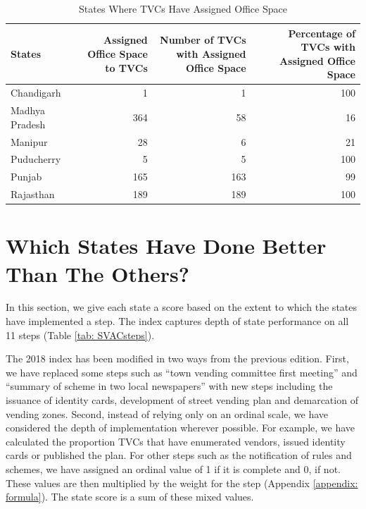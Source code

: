 \documentclass[a4paper, 12pt, twoside]{article}
\begin{document}
{%
\begin{table}[htpb]
\caption{States Where TVCs Have Assigned Office Space}
\label{tab: OfficeSpace}
\begin{tabular}{ l  r r r } %
\toprule
States & \multicolumn{1}{p{9em}}{Assigned Office Space to TVCs} & \multicolumn{1}{p{9em}}{Number of TVCs with Assigned Office Space} & \multicolumn{1}{p{9em}}{Percentage of TVCs with Assigned Office Space}\\
\midrule
Chandigarh & 1 & 1 & 100\\
Madhya Pradesh & 364 & 58 & 16\\
Manipur & 28 & 6 & 21\\
Puducherry & 5 & 5 & 100\\
Punjab & 165 & 163 & 99\\
Rajasthan & 189 & 189 & 100\\
\bottomrule
\end{tabular}
\end{table}

\section*{Which States Have Done Better Than The Others?}
	In this section, we give each state a score based on the extent to which the states have implemented a step. The index captures depth of state performance on all 11 steps (Table \ref{tab: SVACsteps}).

	The 2018 index has been modified in two ways from the previous edition. First, we have replaced some steps such as “town vending committee first meeting”  and “summary of scheme in two local newspapers” with new steps including the issuance of identity cards, development of street vending plan and demarcation of vending zones. Second, instead of relying only on an ordinal scale, we have considered the depth of implementation wherever possible. For example, we have calculated the proportion TVCs that have enumerated vendors, issued identity cards or published the plan. For other steps such as the notification of rules and schemes, we have assigned an ordinal value of 1 if it is complete and 0, if not. These values are then multiplied by the weight for the step (Appendix \ref{appendix: formula}). The state score is a sum of these mixed values.

}
\end{document}
